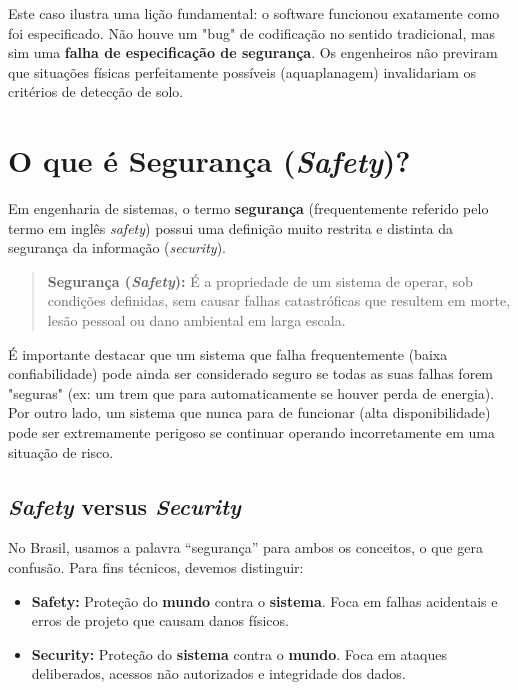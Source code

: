 \documentclass[12pt,a4paper,twoside]{report}
\begin{document}
Este caso ilustra uma lição fundamental: o software funcionou exatamente como foi especificado. Não houve um "bug" de codificação no sentido tradicional, mas sim uma \textbf{falha de especificação de segurança}. Os engenheiros não previram que situações físicas perfeitamente possíveis (aquaplanagem) invalidariam os critérios de detecção de solo.

\section{O que é Segurança (\textit{Safety})?}

Em engenharia de sistemas, o termo \textbf{segurança} (frequentemente referido pelo termo em inglês \emph{safety}) possui uma definição muito restrita e distinta da segurança da informação (\emph{security}).

\begin{quote}
    \textbf{Segurança (\textit{Safety}):} É a propriedade de um sistema de operar, sob condições definidas, sem causar falhas catastróficas que resultem em morte, lesão pessoal ou dano ambiental em larga escala.
\end{quote}

É importante destacar que um sistema que falha frequentemente (baixa confiabilidade) pode ainda ser considerado seguro se todas as suas falhas forem "seguras" (ex: um trem que para automaticamente se houver perda de energia). Por outro lado, um sistema que nunca para de funcionar (alta disponibilidade) pode ser extremamente perigoso se continuar operando incorretamente em uma situação de risco.

\subsection{\textit{Safety} versus \textit{Security}}

No Brasil, usamos a palavra ``segurança'' para ambos os conceitos, o que gera confusão. Para fins técnicos, devemos distinguir:
\begin{itemize}
    \item \textbf{Safety:} Proteção do \textbf{mundo} contra o \textbf{sistema}. Foca em falhas acidentais e erros de projeto que causam danos físicos.
    \item \textbf{Security:} Proteção do \textbf{sistema} contra o \textbf{mundo}. Foca em ataques deliberados, acessos não autorizados e integridade dos dados.
\end{itemize}
\end{document}
